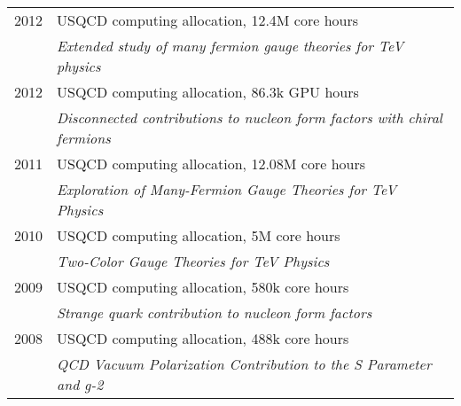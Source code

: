 \begin{spacelist}
\begin{tabular}[t]{cl}
      2012 & USQCD computing allocation, 12.4M core hours                                                         \\ %
           & \textit{Extended study of many fermion gauge theories for TeV physics}                               \\[6 pt]
      2012 & USQCD computing allocation, 86.3k GPU hours                                                          \\ %
           & \textit{Disconnected contributions to nucleon form factors with chiral fermions}                     \\[6 pt]
      2011 & USQCD computing allocation, 12.08M core hours                                                        \\ %
           & \textit{Exploration of Many-Fermion Gauge Theories for TeV Physics}                                  \\[6 pt]
      2010 & USQCD computing allocation, 5M core hours                                                            \\ %
           & \textit{Two-Color Gauge Theories for TeV Physics}                                                    \\[6 pt]
      2009 & USQCD computing allocation, 580k core hours                                                          \\ %
           & \textit{Strange quark contribution to nucleon form factors}                                          \\[6 pt]
      2008 & USQCD computing allocation, 488k core hours                                                          \\ %
           & \textit{QCD Vacuum Polarization Contribution to the S Parameter and g-2}                             \\
    \end{tabular}
\end{spacelist}
